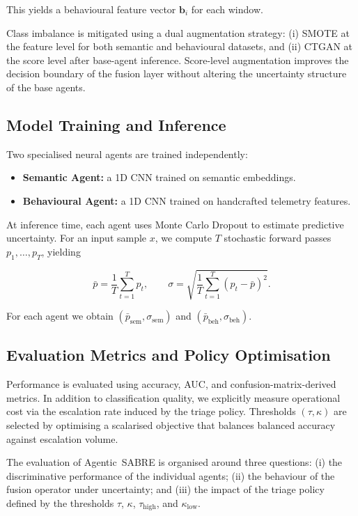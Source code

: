 \documentclass[3p]{elsarticle}
\begin{document}
This yields a behavioural feature vector $\mathbf{b}_i$ for each window.

Class imbalance is mitigated using a dual augmentation strategy: (i) SMOTE at the feature level for both semantic and behavioural datasets, and (ii) CTGAN at the score level after base-agent inference. Score-level augmentation improves the decision boundary of the fusion layer without altering the uncertainty structure of the base agents.

\subsection{Model Training and Inference}


Two specialised neural agents are trained independently:

\begin{itemize}
    \item \textbf{Semantic Agent:} a 1D CNN trained on semantic embeddings.
    \item \textbf{Behavioural Agent:} a 1D CNN trained on handcrafted telemetry features.
\end{itemize}

At inference time, each agent uses Monte Carlo Dropout to estimate predictive
uncertainty. For an input sample $x$, we compute $T$ stochastic forward passes
$p_1, \ldots, p_T$, yielding

\begin{equation}
\bar{p} = \frac{1}{T}\sum_{t=1}^T p_t, \qquad
\sigma = \sqrt{\frac{1}{T}\sum_{t=1}^{T} (p_t - \bar{p})^2}.
\end{equation}

For each agent we obtain $(\bar{p}_{\text{sem}}, \sigma_{\text{sem}})$ and
$(\bar{p}_{\text{beh}}, \sigma_{\text{beh}})$.

\subsection{Evaluation Metrics and Policy Optimisation}

Performance is evaluated using accuracy, AUC, and confusion-matrix-derived
metrics. In addition to classification quality, we explicitly measure
operational cost via the escalation rate induced by the triage policy.
Thresholds $(\tau,\kappa)$ are selected by optimising a scalarised objective
that balances balanced accuracy against escalation volume.

The evaluation of Agentic~SABRE is organised around three questions:  
(i) the discriminative performance of the individual agents;  
(ii) the behaviour of the fusion operator under uncertainty; and  
(iii) the impact of the triage policy defined by the thresholds \(\tau\), \(\kappa\), \(\tau_{\mathrm{high}}\), and \(\kappa_{\mathrm{low}}\).
\end{document}
